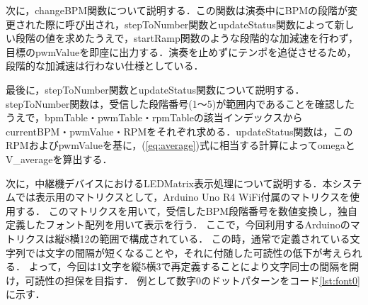次に，changeBPM関数について説明する．この関数は演奏中にBPMの段階が変更された際に呼び出され，stepToNumber関数とupdateStatus関数によって新しい段階の値を求めたうえで，startRamp関数のような段階的な加減速を行わず，目標のpwmValueを即座に出力する．演奏を止めずにテンポを追従させるため，段階的な加減速は行わない仕様としている．

\FloatBarrier



最後に，stepToNumber関数とupdateStatus関数について説明する．stepToNumber関数は，受信した段階番号(1〜5)が範囲内であることを確認したうえで，bpmTable・pwmTable・rpmTableの該当インデックスからcurrentBPM・pwmValue・RPMをそれぞれ求める．updateStatus関数は，このRPMおよびpwmValueを基に，(\ref{eq:average})式に相当する計算によってomegaとV\_averageを算出する．

% 

\fi

次に，中継機デバイスにおけるLEDMatrix表示処理について説明する．本システムでは表示用のマトリクスとして，Arduino Uno R4 WiFi付属のマトリクスを使用する．
このマトリクスを用いて，受信したBPM段階番号を数値変換し，独自定義したフォント配列を用いて表示を行う．
ここで，今回利用するArduinoのマトリクスは縦8横12の範囲で構成されている．
この時，通常で定義されている文字列では文字の間隔が短くなることや，それに付随した可読性の低下が考えられる．
よって，今回は1文字を縦5横3で再定義することにより文字同士の間隔を開け，可読性の担保を目指す．
例として数字0のドットパターンをコード\ref{lst:font0}に示す．

